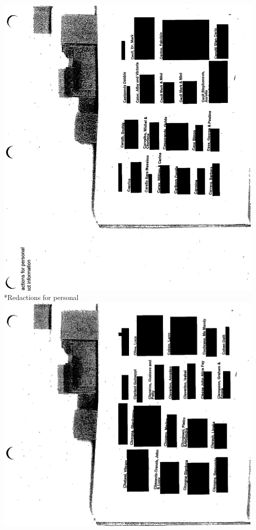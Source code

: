 \documentclass[10pt]{article}
\begin{document}
\includegraphics[max width=\textwidth, center]{2025_02_27_dd68c3d38de88f0516d9g-132}\\
*Redactions for personal\\
\includegraphics[max width=\textwidth, center]{2025_02_27_dd68c3d38de88f0516d9g-133}\\
\end{document}
